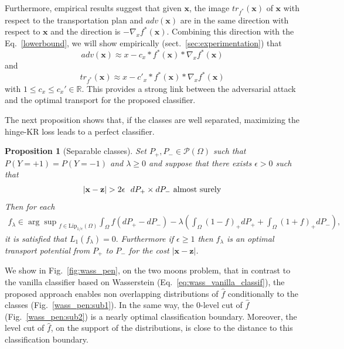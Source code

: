 \documentclass{article}
\newtheorem{Proposition}{Proposition}
\begin{document}
Furthermore, empirical results suggest that given $\textbf{x}$, the image $tr_{f^*}(\textbf{x})$ of $\textbf{x}$ with respect to the transportation plan and $adv(\textbf{x})$ are in the same direction with respect to $\textbf{x}$ and the direction is %
 $-\nabla_x f^*(\textbf{x})$. Combining this direction with the Eq.~\eqref{lowerbound}, we will show empirically (sect.~\ref{sec:experimentation}) that  $$adv(\textbf{x})\approx x-c_x*f^*(\textbf{x})*\nabla_x f^*(\textbf{x})$$ and $$tr_{f^*}(\textbf{x})\approx x-c'_x*f^*(\textbf{x})*\nabla_x f^*(\textbf{x})$$ with $1 \leq c_x \leq c_x' \in \mathbb{R} $. This provides a strong link between the adversarial attack and the optimal transport for the proposed classifier.
 
 
The next proposition shows that, if the classes are well separated, maximizing the hinge-KR loss leads to a perfect classifier.%
\begin{Proposition}[Separable classes]\label{coro:epsilon}
Set  $P_+, P_-\in \mathcal{P}(\Omega)$ such that $P(Y=+1)=P(Y=-1)$ and $\lambda\geq 0$ and suppose that there exists $\epsilon>0$ such that
\begin{align}\label{coro:hipotesis}
	| {\textbf{x}}-{\textbf{{{\textbf{z}}}}} |> 2 \epsilon \ \ dP_+\times dP_- \text{ almost surely}
\end{align}
Then for each
\begin{align}
	f_{\lambda}\in {\arg\sup}_{f\in \text{Lip}_{1/\epsilon}(\Omega)}\int_{\Omega}f(dP_+-dP_-)-\lambda \left( \int_{\Omega}(1-f)_+dP_+ +\int_{\Omega}(1+f)_+dP_-\right),
\end{align}
it is satisfied that $L_1(f_{\lambda})=0.$ Furthermore if $\epsilon\geq 1$ then $f_{\lambda}$ is an optimal transport potential from $P_+$ to $P_-$ for the cost $| {\textbf{x}}-{{\textbf{z}}}|$.
\end{Proposition}
We show in Fig.~\ref{fig:wass_pen}, on the two moons problem, that in contrast to the vanilla classifier based on Wasserstein (Eq.~\eqref{eq:wass_vanilla_classif}), the proposed approach enables non overlapping distributions of $\hat{f}$ conditionally to the classes (Fig.~\ref{wass_pen:sub1}).
In the same way, the 0-level cut of $\hat{f}$ (Fig.~\ref{wass_pen:sub2}) is a nearly optimal classification boundary. Moreover, the level cut of $\hat{f}$, on the support of the distributions, is close to the distance to this classification boundary.
\end{document}
